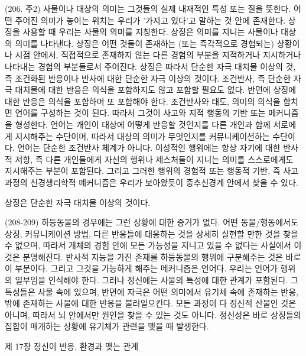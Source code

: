 \documentclass[12pt, a4paper]{article}
\begin{document}
(206. 주2) 사물이나 대상의 의미는 그것들의 실제 내재적인 특성 또는 질을 뜻한다. 어떤 주어진 의미가 놓이는 위치는 우리가 '가지고 있다'고 말하는 것 안에 존재한다. 상징을 사용할 때 우리는 사물의 의미를 지칭한다. 상징은 의미를 지니는 사물이나 대상의 의미를 나타낸다. 상징은 어떤 것들이 존재하는 (또는 즉각적으로 경험되는) 상황이나 시점 안에서, 직접적으로 존재하지 않는 다른 경험의 부분을 지적하거나 지시하거나 나타내는 경험의 부분들로서 주어진다. 상징은 따라서 단순한 자극 대치물 이상의 것, 즉 조건화된 반응이나 반사에 대한 단순한 자극 이상의 것이다. 조건반사, 즉 단순한 자극 대치물에 대한 반응은 의식을 포함하지도 않고 포함할 필요도 없다. 반면에 상징에 대한 반응은 의식을 포함하며 또 포함해야 한다. 조건반사와 태도, 의미의 의식을 합치면 언어를 구성하는 것이 된다. 따라서 그것이 사고와 지적 행동의 기반 또는 메커니즘을 형성한다. 언어는 개인이 대상에 어떻게 반응할 것인지를 다른 개인과 함께 서로에게 지시해주는 수단이며, 따라서 대상의 의미가 무엇인지를 커뮤니케이션하는 수단이다. 언어는 단순한 조건반사 체계가 아니다. 이성적인 행위에는 항상 자기에 대한 반사적 저항, 즉 다른 개인들에게 자신의 행위나 제스처들이 지니는 의미를 스스로에게도 지시해주는 부분이 포함된다. 그리고 그러한 행위의 경험적 또는 행동적 기반, 즉 사고과정의 신경생리학적 메커니즘은 우리가 보아왔듯이 중추신경계 안에서 찾을 수 있다.

상징은 단순한 자극 대치물 이상의 것이다.

(208-209) 하등동물의 경우에는 그런 상황에 대한 증거가 없다. 어떤 동물/행동에서도 상징, 커뮤니케이션 방법, 다른 반응들에 대응하는 것을 상세히 실현할 만한 것을 찾을 수 없으며, 따라서 개체의 경험 안에 모든 가능성을 지니고 있을 수 없다는 사실에서 이것은 분명해진다. 반사적 지능을 가진 존재를 하등동물의 행위에 구분해주는 것은 바로 이 부분이다. 그리고 그것을 가능하게 해주는 메커니즘은 언어다. 우리는 언어가 행위의 일부임을 인식해야 한다. 그러나 정신에는 사물의 특성에 대한 관계가 포함된다. 그 특성들은 사물 속에 있으며, 반면에 자극은 어떤 의미에서 유기체 속에 존재하는 반응, 밖에 존재하는 사물에 대한 반응을 불러일으킨다. 모든 과정이 다 정신적 산물인 것은 아니며, 따라서 뇌 안에서만 원인을 찾을 수 있는 것도 아니다. 정신성은 바로 상징들의 집합이 매개하는 상황에 유기체가 관련을 맺을 때 발생한다.

제 17장 정신이 반응, 환경과 맺는 관계

\newpage
\end{document}
